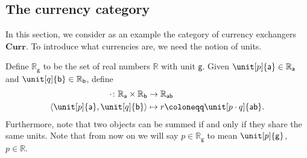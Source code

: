 \subsection{The currency category}
In this section, we consider as an example the category of currency exchangers $\mathbf{Curr}$. To introduce what currencies are, we need the notion of units.
\begin{definition}
    Define $\mathbb{R}_\mathsf{g}$ to be the set of real numbers $\mathbb{R}$ with unit $\mathsf{g}$. Given $\unit[p]{\mathsf{a}} \in \mathbb{R}_\mathsf{a}$ and $\unit[q]{\mathsf{b}}\in \mathbb{R}_\mathsf{b}$, define
    \begin{equation}
    \begin{aligned}
    \cdot \colon \mathbb{R}_\mathsf{a} \times \mathbb{R}_\mathsf{b} &\to \mathbb{R}_\mathsf{ab}\\
    \tup{\unit[p]{\mathsf{a}},\unit[q]{\mathsf{b}}}&\mapsto r\coloneqq \unit[p\cdot q]{\mathsf{ab}}.
    \end{aligned}
    \end{equation}
    Furthermore, note that two objects can be summed if and only if they share the same units. Note that from now on we will say $p\in \mathbb{R}_\mathsf{g}$ to mean $\unit[p]{\mathsf{g}}$, $p\in \mathbb{R}$.
\end{definition}

